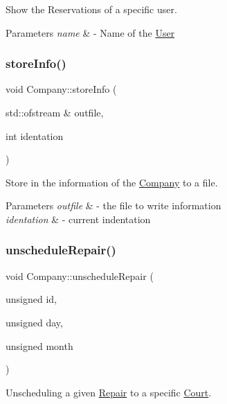 Show the Reservations of a specific user. 


\begin{DoxyParams}{Parameters}
{\em name} & -\/ Name of the \mbox{\hyperlink{class_user}{User}} \\
\hline
\end{DoxyParams}
\mbox{\label{class_company_ac03f62f1accf21eb445a7aa5731b1199}} 
\subsubsection{\texorpdfstring{store\+Info()}{storeInfo()}}
{\footnotesize\ttfamily void Company\+::store\+Info (\begin{DoxyParamCaption}\item[{std\+::ofstream \&}]{outfile,  }\item[{int}]{identation }\end{DoxyParamCaption})}



Store in the information of the \mbox{\hyperlink{class_company}{Company}} to a file. 


\begin{DoxyParams}{Parameters}
{\em outfile} & -\/ the file to write information \\
\hline
{\em identation} & -\/ current indentation \\
\hline
\end{DoxyParams}
\mbox{\label{class_company_a64817eefb5be8a9d23af9e0f651b7f71}} 
\subsubsection{\texorpdfstring{unschedule\+Repair()}{unscheduleRepair()}}
{\footnotesize\ttfamily void Company\+::unschedule\+Repair (\begin{DoxyParamCaption}\item[{unsigned}]{id,  }\item[{unsigned}]{day,  }\item[{unsigned}]{month }\end{DoxyParamCaption})}



Unscheduling a given \mbox{\hyperlink{class_repair}{Repair}} to a specific \mbox{\hyperlink{class_court}{Court}}. 


